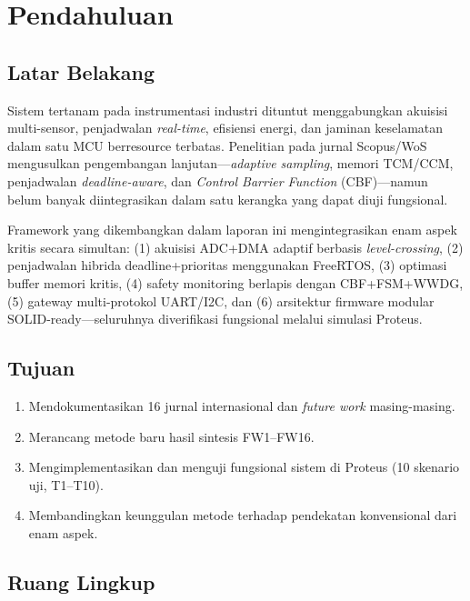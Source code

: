 \documentclass[12pt,a4paper]{article}
\begin{document}
\newpage
\tableofcontents
\newpage
\listoffigures
\newpage
\listoftables
\newpage

\section{Pendahuluan}
\subsection{Latar Belakang}

Sistem tertanam pada instrumentasi industri dituntut menggabungkan akuisisi multi-sensor, penjadwalan \textit{real-time}, efisiensi energi, dan jaminan keselamatan dalam satu MCU berresource terbatas. Penelitian pada jurnal Scopus/WoS mengusulkan pengembangan lanjutan---\textit{adaptive sampling}, memori TCM/CCM, penjadwalan \textit{deadline-aware}, dan \textit{Control Barrier Function} (CBF)---namun belum banyak diintegrasikan dalam satu kerangka yang dapat diuji fungsional.

Framework yang dikembangkan dalam laporan ini mengintegrasikan enam aspek kritis secara simultan: (1) akuisisi ADC+DMA adaptif berbasis \textit{level-crossing}, (2) penjadwalan hibrida deadline+prioritas menggunakan FreeRTOS, (3) optimasi buffer memori kritis, (4) safety monitoring berlapis dengan CBF+FSM+WWDG, (5) gateway multi-protokol UART/I2C, dan (6) arsitektur firmware modular SOLID-ready---seluruhnya diverifikasi fungsional melalui simulasi Proteus.

\subsection{Tujuan}
\begin{enumerate}[label=\alph*.]
    \item Mendokumentasikan 16 jurnal internasional dan \textit{future work} masing-masing.
    \item Merancang metode baru hasil sintesis FW1--FW16.
    \item Mengimplementasikan dan menguji fungsional sistem di Proteus (10 skenario uji, T1--T10).
    \item Membandingkan keunggulan metode terhadap pendekatan konvensional dari enam aspek.
\end{enumerate}

\subsection{Ruang Lingkup}
\end{document}
